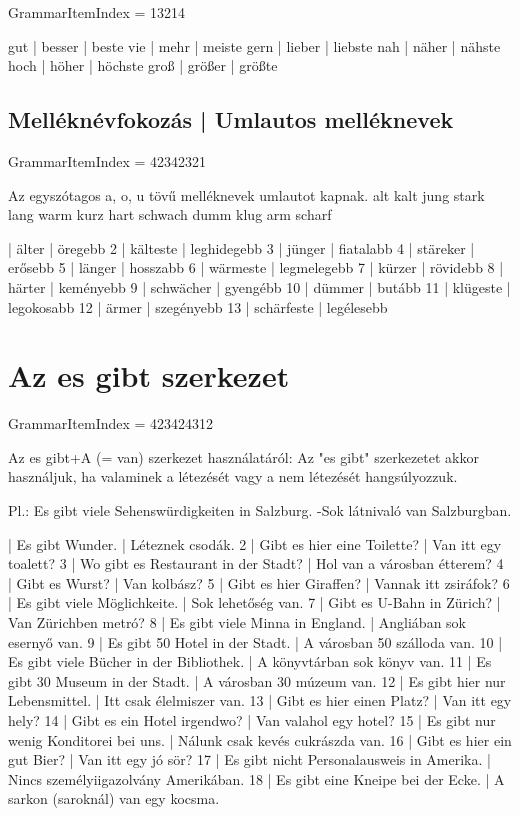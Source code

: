\documentclass{article}
\newenvironment{desc}{\verbatim}{\endverbatim}
\newenvironment{exmp}{\verbatim}{\endverbatim}
\begin{document}
GrammarItemIndex = 13214

\begin{desc}
gut | besser | beste
vie | mehr | meiste
gern | lieber | liebste
nah | näher | nähste
hoch | höher | höchste
groß | größer | größte
\end{desc}

\subsection{Melléknévfokozás | Umlautos melléknevek}

GrammarItemIndex = 42342321

\begin{desc}
Az egyszótagos a, o, u tövű melléknevek umlautot kapnak.
alt
kalt
jung
stark
lang
warm
kurz
hart
schwach
dumm
klug
arm
scharf
\end{desc}

\begin{exmp}
1 | älter | öregebb
2 | kälteste | leghidegebb
3 | jünger | fiatalabb
4 | stäreker | erősebb
5 | länger | hosszabb
6 | wärmeste | legmelegebb
7 | kürzer | rövidebb
8 | härter | keményebb
9 | schwächer | gyengébb
10 | dümmer | butább
11 | klügeste | legokosabb
12 | ärmer | szegényebb
13 | schärfeste | legélesebb
\end{exmp}

\section{Az es gibt szerkezet}

GrammarItemIndex = 423424312

\begin{desc}
Az es gibt+A (= van) szerkezet használatáról: Az "es gibt" szerkezetet akkor használjuk, ha valaminek a létezését vagy a nem létezését hangsúlyozzuk.

Pl.: Es gibt viele Sehenswürdigkeiten in Salzburg. -Sok látnivaló van Salzburgban.
\end{desc}

\begin{exmp}
1 | Es gibt Wunder. | Léteznek csodák.
2 | Gibt es hier eine Toilette? | Van itt egy toalett?
3 | Wo gibt es Restaurant in der Stadt? | Hol van a városban étterem?
4 | Gibt es Wurst? | Van kolbász?
5 | Gibt es hier Giraffen? | Vannak itt zsiráfok?
6 | Es gibt viele Möglichkeite. | Sok lehetőség van.
7 | Gibt es U-Bahn in Zürich? | Van Zürichben metró?
8 | Es gibt viele Minna in England. | Angliában sok esernyő van.
9 | Es gibt 50 Hotel in der Stadt. | A városban 50 szálloda van.
10 | Es gibt viele Bücher in der Bibliothek. | A könyvtárban sok könyv van.
11 | Es gibt 30 Museum in der Stadt. | A városban 30 múzeum van.
12 | Es gibt hier nur Lebensmittel. | Itt csak élelmiszer van.
13 | Gibt es hier einen Platz? | Van itt egy hely?
14 | Gibt es ein Hotel irgendwo? | Van valahol egy hotel?
15 | Es gibt nur wenig Konditorei bei uns. | Nálunk csak kevés cukrászda van.
16 | Gibt es hier ein gut Bier? | Van itt egy jó sör?
17 | Es gibt nicht Personalausweis in Amerika. | Nincs személyiigazolvány Amerikában.
18 | Es gibt eine Kneipe bei der Ecke. | A sarkon (saroknál) van egy kocsma.
\end{exmp}
\end{document}
